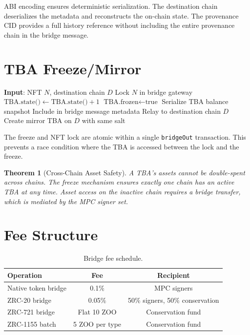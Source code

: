 \documentclass[11pt,letterpaper]{article}
\newtheorem{theorem}{Theorem}[section]
\begin{document}
ABI encoding ensures deterministic serialization. The destination chain deserializes the metadata and reconstructs the on-chain state. The provenance CID provides a full history reference without including the entire provenance chain in the bridge message.

\section{TBA Freeze/Mirror}
\label{sec:tba}

\begin{algorithm}[t]
\caption{TBA Freeze on Bridge-Out}
\label{alg:freeze}
\begin{algorithmic}[1]
\STATE \textbf{Input}: NFT $N$, destination chain $D$
\STATE Lock $N$ in bridge gateway
\STATE $\text{TBA.state()} \leftarrow \text{TBA.state()} + 1$ 
\STATE $\text{TBA.frozen} \leftarrow \text{true}$
\STATE Serialize TBA balance snapshot
\STATE Include in bridge message metadata
\STATE Relay to destination chain $D$
\STATE Create mirror TBA on $D$ with same salt
\end{algorithmic}
\end{algorithm}

The freeze and NFT lock are atomic within a single \texttt{bridgeOut} transaction. This prevents a race condition where the TBA is accessed between the lock and the freeze.

\begin{theorem}[Cross-Chain Asset Safety]
A TBA's assets cannot be double-spent across chains. The freeze mechanism ensures exactly one chain has an active TBA at any time. Asset access on the inactive chain requires a bridge transfer, which is mediated by the MPC signer set.
\end{theorem}

\section{Fee Structure}

\begin{table}[t]
\centering
\begin{tabular}{lcc}
\toprule
\textbf{Operation} & \textbf{Fee} & \textbf{Recipient} \\
\midrule
Native token bridge & 0.1\% & MPC signers \\
ZRC-20 bridge & 0.05\% & 50\% signers, 50\% conservation \\
ZRC-721 bridge & Flat 10 ZOO & Conservation fund \\
ZRC-1155 batch & 5 ZOO per type & Conservation fund \\
\bottomrule
\end{tabular}
\caption{Bridge fee schedule.}
\label{tab:fees}
\end{table}
\end{document}
